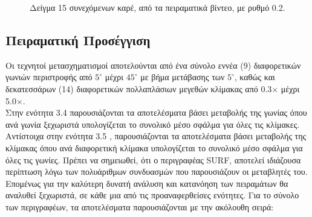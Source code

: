 \newpage

\begin{figure}

\centering   
{}

\caption{Δείγμα 15 συνεχόμενων καρέ,  από τα πειραματικά βίντεο, με ρυθμό 0.2\textquotesingle\textquotesingle.}
\label{fig:fig_seq}
\end{figure}
 
\subsection{Πειραματική Προσέγγιση}

Οι τεχνητοί μετασχηματισμοί αποτελούνται από ένα σύνολο εννέα (9) διαφορετικών γωνιών περιστροφής από $5^{\circ}$ μέχρι $45^{\circ}$ με βήμα μετάβασης των $5^{\circ}$,
καθώς και δεκατεσσάρων (14) διαφορετικών  πολλαπλάσιων μεγεθών κλίμακας από 0.3$\times$ μέχρι 5.0$\times$.\\
 Στην ενότητα 3.4 παρουσιάζονται τα αποτελέσματα βάσει μεταβολής της γωνίας όπου ανά γωνία ξεχωριστά υπολογίζεται το συνολικό μέσο σφάλμα για όλες τις κλίμακες. Αντίστοιχα
 στην ενότητα 3.5 , παρουσιάζονται τα αποτελέσματα βάσει μεταβολής της κλίμακας όπου ανά διαφορετική κλίμακα υπολογίζεται το συνολικό μέσο σφάλμα για όλες τις γωνίες.
 Πρέπει να σημειωθεί, ότι ο περιγραφέας SURF, αποτελεί ιδιάζουσα περίπτωση λόγω των πολυάριθμων συνδυασμών που παρουσιάζουν οι μεταβλητές του. 
 Επομένως για την καλύτερη δυνατή ανάλυση και κατανόηση των πειραμάτων θα αναλυθεί ξεχωριστά, σε κάθε μια από τις προαναφερθείσες ενότητες. 
Για το σύνολο των περιγραφέων, τα αποτελέσματα παρουσιάζονται με την ακόλουθη σειρά:

